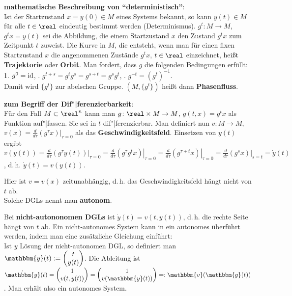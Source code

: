 \linie

\textbf{mathematische Beschreibung von "`deterministisch"'}: \\
Ist der Startzustand $x = y(0) \in M$ eines Systems bekannt, so kann
$y(t) \in M$ für alle $t \in \real$ eindeutig bestimmt werden (Determinismus).
$g^t\colon M \rightarrow M$, $g^t x = y(t)$ sei die Abbildung, die einem
Startzustand $x$ den Zustand $g^t x$ zum Zeitpunkt $t$ zuweist.
Die Kurve in $M$, die entsteht, wenn man für einen fixen Startzustand $x$
die angenommenen Zustände $g^t x$, $t \in \real$ einzeichnet, heißt
\textbf{Trajektorie} oder \textbf{Orbit}.
Man fordert, dass $g$ die folgenden Bedingungen erfüllt: \\
1. $g^0 = \operatorname{id}$, . $g^{t+s} = g^t g^s = g^{s+t} = g^s g^t$, . $g^{-t} = (g^t)^{-1}$. \\
Damit wird $\{g^t\}$ zur abelschen Gruppe.
$(M, \{g^t\})$ heißt dann \textbf{Phasenfluss}.

\linie
\pagebreak

\textbf{zum Begriff der Dif"|ferenzierbarkeit}: \\
Für den Fall $M \subset \real^n$ kann man
$g\colon \real \times M \rightarrow M$, $g(t, x) = g^t x$ als Funktion
auf"|fassen.
Sie sei in $t$ dif"|ferenzierbar.
Man definiert nun $v\colon M \rightarrow M$,
$v(x) = \frac{d}{d\tau}\left.(g^\tau x)\right|_{\tau=0}$ als das
\textbf{Geschwindigkeitsfeld}.
Einsetzen von $y(t)$ ergibt $v(y(t)) =
\frac{d}{d\tau}\left.(g^\tau y(t))\right|_{\tau=0} =
\frac{d}{d\tau}\left.(g^\tau g^t x)\right|_{\tau=0} =
\frac{d}{d\tau}\left.(g^{\tau+t} x)\right|_{\tau=0} =
\frac{d}{d\tau}\left.(g^s x)\right|_{s=t} = \dot{y}(t)$, d.\,h.
\textbf{$\dot{y}(t) = v(y(t))$}.

Hier ist $v = v(x)$ zeitunabhängig, d.\,h. das Geschwindigkeitsfeld hängt nicht
von $t$ ab. \\
Solche DGLs nennt man \textbf{autonom}.

\linie

Bei \textbf{nicht-autononomen DGLs} ist $\dot{y}(t) = v(t, y(t))$,
d.\,h. die rechte Seite hängt von $t$ ab.
Ein nicht-autonomes System kann in ein autonomes überführt werden, indem
man eine zusätzliche Gleichung einführt: \\
Ist $y$ Lösung der nicht-autonomen DGL, so definiert man
$\mathbbm{y}(t) := \begin{pmatrix}t \\ y(t)\end{pmatrix}$.
Die Ableitung ist $\dot{\mathbbm{y}}(t) =
\begin{pmatrix}1 \\ v(t, y(t))\end{pmatrix} =
\begin{pmatrix}1 \\ v(\mathbbm{y}(t))\end{pmatrix} =:
\mathbbm{v}(\mathbbm{y}(t))$.
Man erhält also ein autonomes System.

